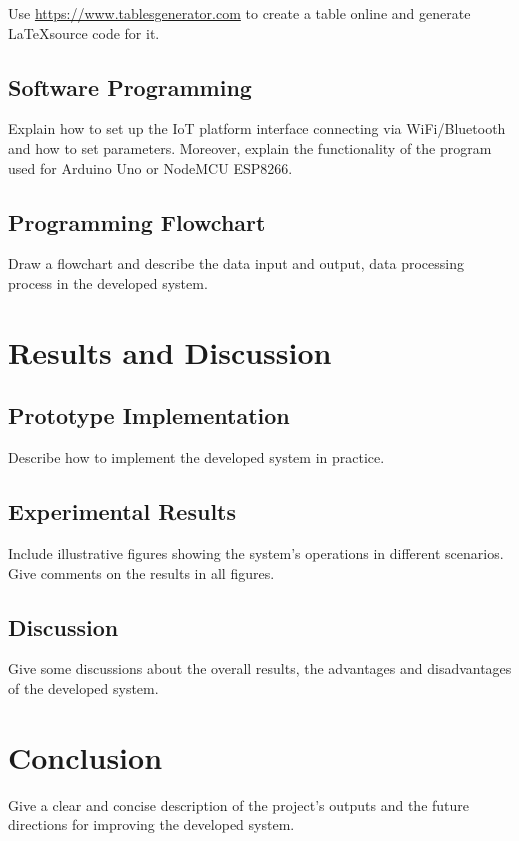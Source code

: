 \documentclass[conference, onecolumn]{IEEEtran}
\begin{document}
Use \href{https://www.tablesgenerator.com}{https://www.tablesgenerator.com} to create a table online and generate \LaTeX source code for it.

\subsection{Software Programming}
Explain how to set up the IoT platform interface connecting via WiFi/Bluetooth and how to set parameters. Moreover, explain the functionality of the program used for Arduino Uno or NodeMCU ESP8266.

\subsection{Programming Flowchart}
Draw a flowchart and describe the data input and output, data processing process in the developed system.

\section{Results and Discussion}
\subsection{Prototype Implementation}
Describe how to implement the developed system in practice.

\subsection{Experimental Results}
Include illustrative figures showing the system's operations in different scenarios. Give comments on the results in all figures.

\subsection{Discussion}
Give some discussions about the overall results, the advantages and disadvantages of the developed system.

\section{Conclusion}
Give a clear and concise description of the project’s outputs and the future directions for improving the developed system.
\end{document}
